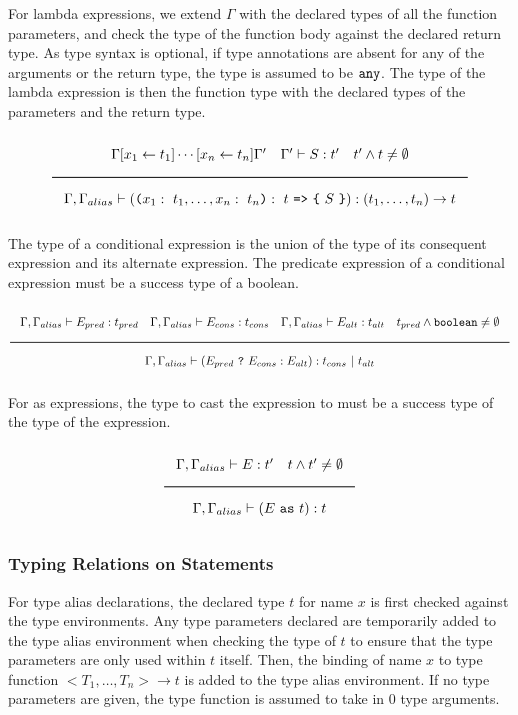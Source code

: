 For lambda expressions, we extend $\Gamma$ with the declared types of all the function parameters,
and check the type of the function body against the declared return type.
As type syntax is optional, if type annotations are absent for any of the arguments or the return type, the type is assumed to be $\texttt{any}$.
The type of the lambda expression is then the function type with the declared types of the parameters and the return type. 

\noindent
\[
  \Rule{\Gamma [x_1 \leftarrow t_1] \cdots [x_n \leftarrow t_n] \Gamma' \quad \Gamma' \vdash S : t' \quad t' \wedge t \neq \emptyset}{
    \Gamma, \Gamma_{alias} \vdash ( \Lp  x_1:\ t_1, \ldots, x_n:\ t_n \Rp :\ t\ \texttt{=>}\ \Lc\ S\ \Rc) : (t_1, \ldots, t_n) \rightarrow t}  
\]
\noindent

The type of a conditional expression is the union of the type of its consequent expression and its alternate expression.
The predicate expression of a conditional expression must be a success type of a boolean.

\noindent
\[
  \Rule{\Gamma, \Gamma_{alias} \vdash E_{pred} : t_{pred} \quad \Gamma, \Gamma_{alias} \vdash E_{cons} : t_{cons} \quad \Gamma, \Gamma_{alias} \vdash E_{alt} : t_{alt}
    \quad t_{pred} \wedge \Bool \neq \emptyset}{\Gamma, \Gamma_{alias} \vdash (E_{pred}\ \texttt{?}\ E_{cons} : E_{alt}) : t_{cons}\ |\ t_{alt}}
\]
\noindent

For as expressions, the type to cast the expression to must be a success type of the type of the expression.

\noindent
\[
  \Rule{\Gamma, \Gamma_{alias} \vdash E : t' \quad t \wedge t' \neq \emptyset}{\Gamma, \Gamma_{alias} \vdash (E\ \texttt{as}\ t) : t}  
\]
\noindent

\subsubsection{Typing Relations on Statements}

For type alias declarations, the declared type $t$ for name $x$ is first checked against the type environments.
Any type parameters declared are temporarily added to the type alias environment when checking the type of $t$
to ensure that the type parameters are only used within $t$ itself.
Then, the binding of name $x$ to type function $<T_1, \ldots, T_n> \rightarrow t$ is added to the type alias environment.
If no type parameters are given, the type function is assumed to take in 0 type arguments.

